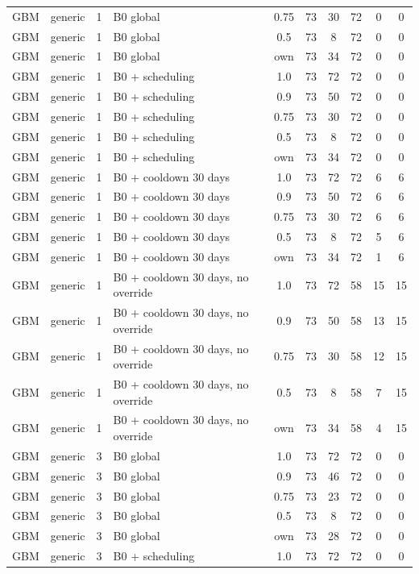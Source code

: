 \begin{longtable}{lllp{4.4cm}cccccc}
GBM & generic & 1 & B0 global & 0.75 & 73 & 30 & 72 & 0 & 0 \\
GBM & generic & 1 & B0 global & 0.5 & 73 & 8 & 72 & 0 & 0 \\
GBM & generic & 1 & B0 global & own & 73 & 34 & 72 & 0 & 0 \\
GBM & generic & 1 & B0 + scheduling & 1.0 & 73 & 72 & 72 & 0 & 0 \\
GBM & generic & 1 & B0 + scheduling & 0.9 & 73 & 50 & 72 & 0 & 0 \\
GBM & generic & 1 & B0 + scheduling & 0.75 & 73 & 30 & 72 & 0 & 0 \\
GBM & generic & 1 & B0 + scheduling & 0.5 & 73 & 8 & 72 & 0 & 0 \\
GBM & generic & 1 & B0 + scheduling & own & 73 & 34 & 72 & 0 & 0 \\
GBM & generic & 1 & B0 + cooldown 30 days & 1.0 & 73 & 72 & 72 & 6 & 6 \\
GBM & generic & 1 & B0 + cooldown 30 days & 0.9 & 73 & 50 & 72 & 6 & 6 \\
GBM & generic & 1 & B0 + cooldown 30 days & 0.75 & 73 & 30 & 72 & 6 & 6 \\
GBM & generic & 1 & B0 + cooldown 30 days & 0.5 & 73 & 8 & 72 & 5 & 6 \\
GBM & generic & 1 & B0 + cooldown 30 days & own & 73 & 34 & 72 & 1 & 6 \\
GBM & generic & 1 & B0 + cooldown 30 days, no override & 1.0 & 73 & 72 & 58 & 15 & 15 \\
GBM & generic & 1 & B0 + cooldown 30 days, no override & 0.9 & 73 & 50 & 58 & 13 & 15 \\
GBM & generic & 1 & B0 + cooldown 30 days, no override & 0.75 & 73 & 30 & 58 & 12 & 15 \\
GBM & generic & 1 & B0 + cooldown 30 days, no override & 0.5 & 73 & 8 & 58 & 7 & 15 \\
GBM & generic & 1 & B0 + cooldown 30 days, no override & own & 73 & 34 & 58 & 4 & 15 \\
GBM & generic & 3 & B0 global & 1.0 & 73 & 72 & 72 & 0 & 0 \\
GBM & generic & 3 & B0 global & 0.9 & 73 & 46 & 72 & 0 & 0 \\
GBM & generic & 3 & B0 global & 0.75 & 73 & 23 & 72 & 0 & 0 \\
GBM & generic & 3 & B0 global & 0.5 & 73 & 8 & 72 & 0 & 0 \\
GBM & generic & 3 & B0 global & own & 73 & 28 & 72 & 0 & 0 \\
GBM & generic & 3 & B0 + scheduling & 1.0 & 73 & 72 & 72 & 0 & 0 \\

\end{longtable}
